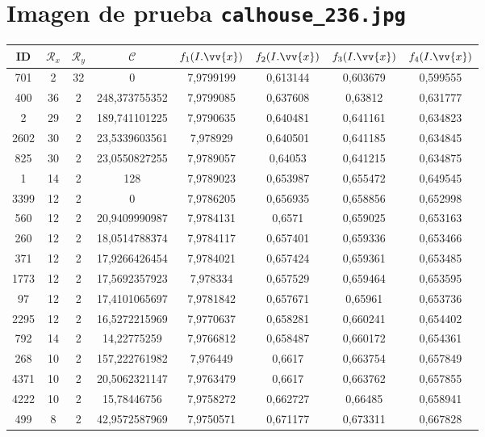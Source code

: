 \section{Imagen de prueba \texttt{calhouse\_236.jpg}}

\scriptsize
\begin{longtable}{|c|c|c|c|c|c|c|c|}
\hline
ID & $\mathscr{R}_x$ & $\mathscr{R}_y$ & $\mathscr{C}$ & $f_1(I.\vv{x})$ & $f_2(I.\vv{x})$ & $f_3(I.\vv{x})$ & $f_4(I.\vv{x})$ \\
\hline
701 & 2 & 32 & 0 & 7,9799199 & 0,613144 & 0,603679 & 0,599555 \\
400 & 36 & 2 & 248,373755352 & 7,9799085 & 0,637608 & 0,63812 & 0,631777 \\
2 & 29 & 2 & 189,741101225 & 7,9790635 & 0,640481 & 0,641161 & 0,634823 \\
2602 & 30 & 2 & 23,5339603561 & 7,978929 & 0,640501 & 0,641185 & 0,634845 \\
825 & 30 & 2 & 23,0550827255 & 7,9789057 & 0,64053 & 0,641215 & 0,634875 \\
1 & 14 & 2 & 128 & 7,9789023 & 0,653987 & 0,655472 & 0,649545 \\
3399 & 12 & 2 & 0 & 7,9786205 & 0,656935 & 0,658856 & 0,652998 \\
560 & 12 & 2 & 20,9409990987 & 7,9784131 & 0,6571 & 0,659025 & 0,653163 \\
260 & 12 & 2 & 18,0514788374 & 7,9784117 & 0,657401 & 0,659336 & 0,653466 \\
371 & 12 & 2 & 17,9266426454 & 7,9784021 & 0,657424 & 0,659361 & 0,653485 \\
1773 & 12 & 2 & 17,5692357923 & 7,978334 & 0,657529 & 0,659464 & 0,653595 \\
97 & 12 & 2 & 17,4101065697 & 7,9781842 & 0,657671 & 0,65961 & 0,653736 \\
2295 & 12 & 2 & 16,5272215969 & 7,9770637 & 0,658281 & 0,660241 & 0,654402 \\
792 & 14 & 2 & 14,22775259 & 7,9766812 & 0,658487 & 0,660172 & 0,654361 \\
268 & 10 & 2 & 157,222761982 & 7,976449 & 0,6617 & 0,663754 & 0,657849 \\
4371 & 10 & 2 & 20,5062321147 & 7,9763479 & 0,6617 & 0,663762 & 0,657855 \\
4222 & 10 & 2 & 15,78446756 & 7,9758272 & 0,662727 & 0,66485 & 0,658941 \\
499 & 8 & 2 & 42,9572587969 & 7,9750571 & 0,671177 & 0,673311 & 0,667828 \\

\end{longtable}
